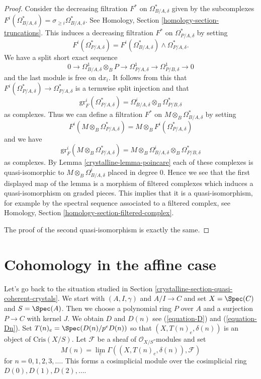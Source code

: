 \begin{proof}

Consider the decreasing filtration $F^*$ on $\Omega^*_{B/A, \delta}$
given by the subcomplexes
$F^i(\Omega^*_{B/A, \delta}) = \sigma_{\geq i}\Omega^*_{B/A, \delta}$.
See Homology, Section \ref{homology-section-truncations}.
This induces a decreasing filtration $F^*$ on $\Omega^*_{P/A, \delta}$
by setting
$$
F^i(\Omega^*_{P/A, \delta}) =
F^i(\Omega^*_{B/A, \delta}) \wedge \Omega^*_{P/A, \delta}.
$$
We have a split short exact sequence
$$
0 \to \Omega^1_{B/A, \delta} \otimes_B P \to
\Omega^1_{P/A, \delta} \to
\Omega^1_{P/B, \delta} \to 0
$$
and the last module is free on $\text{d}x_i$. It follows from this that
$F^i(\Omega^*_{P/A, \delta}) \to \Omega^*_{P/A, \delta}$ is a termwise
split injection and that
$$
\text{gr}^i_F(\Omega^*_{P/A, \delta}) =
\Omega^i_{B/A, \delta} \otimes_B \Omega^*_{P/B, \delta}
$$
as complexes. Thus we can define a filtration $F^*$ on
$M \otimes_B \Omega^*_{B/A, \delta}$ by setting
$$
F^i(M \otimes_B \Omega^*_{P/A, \delta}) =
M \otimes_B F^i(\Omega^*_{P/A, \delta})
$$
and we have
$$
\text{gr}^i_F(M \otimes_B \Omega^*_{P/A, \delta}) =
M \otimes_B \Omega^i_{B/A, \delta} \otimes_B \Omega^*_{P/B, \delta}
$$
as complexes.
By Lemma \ref{crystalline-lemma-poincare} each of these complexes is
quasi-isomorphic to $M \otimes_B \Omega^i_{B/A, \delta}$ placed in degree $0$.
Hence we see that the first displayed map of the lemma is a morphism of
filtered complexes which induces a quasi-isomorphism on graded pieces. This
implies that it is a quasi-isomorphism, for example by the spectral sequence
associated to a filtered complex, see
Homology, Section \ref{homology-section-filtered-complex}.

\medskip\noindent
The proof of the second quasi-isomorphism is exactly the same.
\end{proof}

\section{Cohomology in the affine case}
\label{crystalline-section-cohomology-affine}
Let's go back to the situation studied in
Section \ref{crystalline-section-quasi-coherent-crystals}. We
start with $(A, I, \gamma)$ and $A/I \to C$ and set
$X = \Spec(C)$ and $S = \Spec(A)$. Then we choose
a polynomial ring $P$ over $A$ and a surjection $P \to C$ with
kernel $J$. We obtain $D$ and $D(n)$ see
(\ref{equation-D}) and (\ref{equation-Dn}).
Set $T(n)_e = \Spec(D(n)/p^eD(n))$ so that
$(X, T(n)_e, \delta(n))$ is an object of $\text{Cris}(X/S)$.
Let $\mathcal{F}$ be a sheaf of $\mathcal{O}_{X/S}$-modules and set
$$
M(n) = \lim_e \Gamma((X, T(n)_e, \delta(n)), \mathcal{F})
$$
for $n = 0, 1, 2, 3, \ldots$. This forms a cosimplicial module
over the cosimplicial ring $D(0), D(1), D(2), \ldots$.

